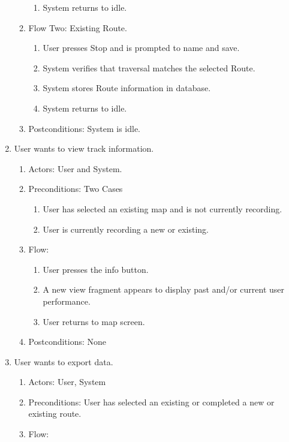 ﻿\documentclass{article}
\begin{document}
\begin{enumerate}
\begin{enumerate}
\begin{enumerate}
            \item System returns to idle.
            \end{enumerate}
        \item Flow Two: Existing Route.
            \begin{enumerate}
            \item User presses Stop and is prompted to name and save.
            \item System verifies that traversal matches the selected Route.
            \item System stores Route information in database.
            \item System returns to idle.
            \end{enumerate}
        \item Postconditions: System is idle.
    \end{enumerate}
\item User wants to view track information.
    \begin{enumerate}
        \item Actors: User and System.
        \item Preconditions: Two Cases
            \begin{enumerate}
            \item User has selected an existing map and is not currently recording.
            \item User is currently recording a new or existing.
            \end{enumerate}
        \item Flow:
            \begin{enumerate}
            \item User presses the info button.
            \item A new view fragment appears to display past and/or current user performance.
            \item User returns to map screen.
            \end{enumerate}
        \item Postconditions: None
    \end{enumerate}
\item User wants to export data.
    \begin{enumerate}
        \item Actors: User, System
        \item Preconditions: User has selected an existing or completed a new or existing route.
        \item Flow:

\end{enumerate}
\end{enumerate}
\end{document}
